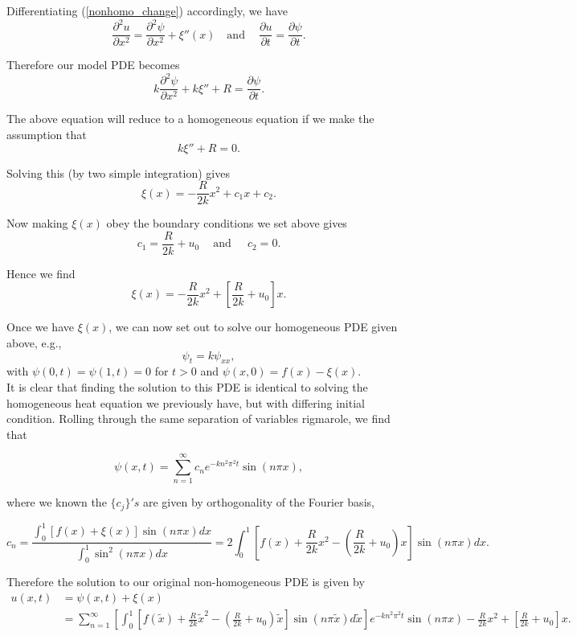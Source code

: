 \begin{itemize}
Differentiating (\ref{nonhomo_change}) accordingly, we have
$$\frac{\partial^2 u}{\partial x^2} = \frac{\partial^2 \psi}{\partial x^2} + \xi''(x) \ \ \ \mbox{ and } \ \ \ \ \frac{\partial u}{\partial t} = \frac{\partial \psi}{\partial t}.$$

Therefore our model PDE becomes
$$k\frac{\partial^2 \psi}{\partial x^2} + k\xi'' + R = \frac{\partial\psi}{\partial t}.$$

The above equation will reduce to a homogeneous equation if we make the assumption that $$k\xi'' + R = 0.$$

Solving this (by two simple integration) gives $$\xi(x) = -\frac{R}{2k}x^2 + c_1 x + c_2.$$

Now making $\xi(x)$ obey the boundary conditions we set above gives
$$c_1 = \frac{R}{2k}+u_0 \ \ \ \ \mbox{ and } \ \ \ \ \ c_2 = 0.$$ 

Hence we find $$\xi(x) = -\frac{R}{2k}x^2 + \left[ \frac{R}{2k}+u_0\right]x.$$

Once we have $\xi(x)$, we can now set out to solve our homogeneous PDE given above, e.g., $$\psi_t  = k \psi_{xx},$$ with $\psi(0,t)=\psi(1,t) = 0$ for $t>0$ and $\psi(x,0) = f(x) - \xi(x).$ \\

It is clear that finding the solution to this PDE is identical to solving the homogeneous heat equation we previously have, but with differing initial condition. Rolling through the same separation of variables rigmarole, we find that 

$$\psi(x,t) = \sum_{n=1}^{\infty} c_n e^{-k n^2 \pi^2 t} \sin(n\pi x),$$

where we known the $\{c_j\}'s$ are given by orthogonality of the Fourier basis, 

$$c_n =  \frac{  \int_{0}^{1} \left[ f(x) + \xi(x) \right] \sin(n\pi x) dx }{\int_{0}^{1} \sin^2(n\pi x) dx } = 2 \int_{0}^{1} \left[ f(x) + \frac{R}{2k}x^2 - \left(\frac{R}{2k}+u_0\right) x \right] \sin(n\pi x) dx.$$

Therefore the solution to our original non-homogeneous PDE is given by
\begin{align*}
u(x,t) &= \psi(x,t) + \xi(x)\\ 
&=\sum_{n=1}^{\infty} \left[ \int_{0}^{1} \left[ f(\tilde{x}) + \frac{R}{2k}\tilde{x}^2 - \left(\frac{R}{2k}+u_0\right) \tilde{x} \right] \sin(n\pi \tilde{x}) d\tilde{x} \right] e^{-kn^2  \pi^2 t} \sin(n\pi x)   -  \frac{R}{2k}x^2 + \left[ \frac{R}{2k}+u_0\right]x.\\
\end{align*}


\end{itemize}
